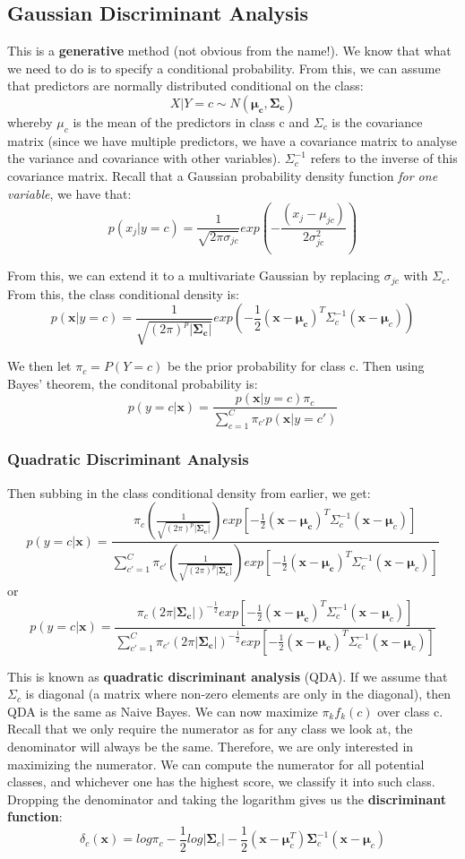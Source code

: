 \documentclass[11pt, oneside]{article}
\theoremstyle{definition}
\begin{document}
\subsection{Gaussian Discriminant Analysis}
This is a \textbf{generative} method (not obvious from the name!). We know that what we need to do is to specify a conditional probability. From this, we can assume that predictors are normally distributed conditional on the class:
$$
X|Y = c \sim N(\bm{\mu_c}, \bm{\Sigma_c})
$$
whereby $\mu_c$ is the mean of the predictors in class c and $\Sigma_c$ is the covariance matrix (since we have multiple predictors, we have a covariance matrix to analyse the variance and covariance with other variables). $\Sigma_c^{-1}$ refers to the inverse of this covariance matrix. Recall that a Gaussian probability density function \textit{for one variable}, we have that:
$$
p(x_j|y=c) = \frac{1}{\sqrt{2\pi \sigma_{jc}}}exp(-\frac{(x_j - \mu_{jc})}{2\sigma_{jc}^2})
$$

From this, we can extend it to a multivariate Gaussian by replacing $\sigma_{jc}$ with $\Sigma_{c}$. From this, the class conditional density is:
$$
p(\bm{x}|y=c) = \frac{1}{\sqrt{(2\pi)^p|\bm{\Sigma_c}|}}exp(-\frac{1}{2}(\bm{x}-\bm{\mu_c})^T \Sigma_{c}^{-1}(\bm{x} - \bm{\mu}_c))
$$

We then let $\pi_c = P(Y=c)$ be the prior probability for class c. Then using Bayes' theorem, the conditonal probability is:
$$
p(y=c|\bm{x}) = \frac{p(\bm{x}|y=c)\pi_c}{\sum\limits_{c=1}^{C}\pi_{c'}p(\bm{x}|y=c')}
$$
\subsubsection{Quadratic Discriminant Analysis}
Then subbing in the class conditional density from earlier, we get:
$$
p(y=c|\bm{x}) = \frac{\pi_c(\frac{1}{\sqrt{(2\pi)^p|\bm{\Sigma_c}|}})exp[-\frac{1}{2}(\bm{x}-\bm{\mu_c})^T \Sigma_{c}^{-1}(\bm{x} - \bm{\mu}_c)]}{\sum\limits_{c'=1}^{C}\pi_{c'}(\frac{1}{\sqrt{(2\pi)^p|\bm{\Sigma_c}|}})exp[-\frac{1}{2}(\bm{x}-\bm{\mu_c})^T \Sigma_{c}^{-1}(\bm{x} - \bm{\mu}_c)]}
$$
or
$$
p(y=c|\bm{x}) = \frac{\pi_c(2\pi|\bm{\Sigma_c}|)^{-\frac{1}{2}}exp[-\frac{1}{2}(\bm{x}-\bm{\mu_c})^T \Sigma_{c}^{-1}(\bm{x} - \bm{\mu}_c)]}{\sum\limits_{c'=1}^{C}\pi_{c'}(2\pi|\bm{\Sigma_c}|)^{-\frac{1}{2}}exp[-\frac{1}{2}(\bm{x}-\bm{\mu_c})^T \Sigma_{c}^{-1}(\bm{x} - \bm{\mu}_c)]}
$$

This is known as \textbf{quadratic discriminant analysis} (QDA). If we assume that $\Sigma_c$ is diagonal (a matrix where non-zero elements are only in the diagonal), then QDA is the same as Naive Bayes. We can now maximize $\pi_kf_k(c)$ over class c. Recall that we only require the numerator as for any class we look at, the denominator will always be the same. Therefore, we are only interested in maximizing the numerator. We can compute the numerator for all potential classes, and whichever one has the highest score, we classify it into such class. Dropping the denominator and taking the logarithm gives us the \textbf{discriminant function}:
$$
\delta_c(\bm{x}) = log\pi_c - \frac{1}{2}log|\bm{\Sigma}_c| - \frac{1}{2}(\bm{x} - \bm{\mu}_c^T)\bm{\Sigma}_c^{-1}(\bm{x}-\bm{\mu}_c)
$$
\end{document}
